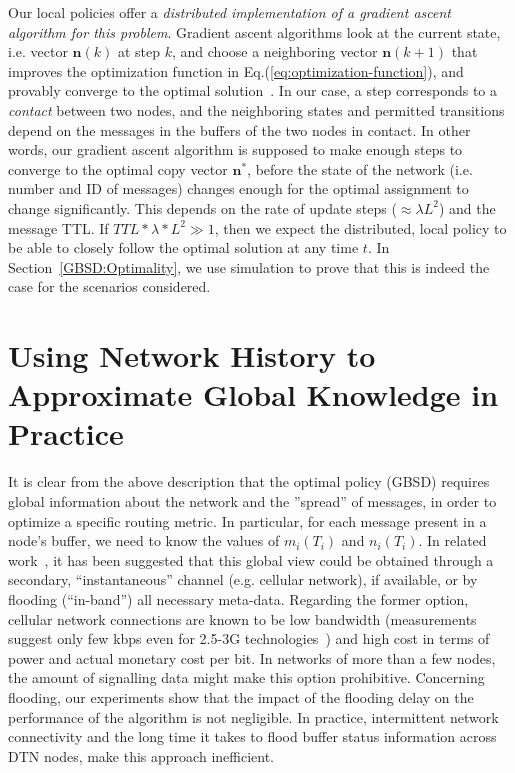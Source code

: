 Our local policies offer a \emph{distributed implementation of a gradient ascent algorithm for this problem}. Gradient ascent algorithms look at the current state, i.e. vector $\mathbf{n}(k)$ at step $k$, and choose a neighboring vector $\mathbf{n}(k+1)$ that improves the optimization function in Eq.(\ref{eq:optimization-function}), and provably converge to the optimal solution~\cite{Boyd:convex-optimization-book}. In our case, a step corresponds to a \emph{contact} between two nodes, and the neighboring states and permitted transitions depend on the messages in the buffers of the two nodes in contact. In other words, our gradient ascent algorithm is supposed to make enough steps to converge to the optimal copy vector $\mathbf{n^{*}}$, before the state of the network (i.e. number and ID of messages) changes enough for the optimal assignment to change significantly. This depends on the rate of update steps ($\approx \lambda L^{2}$) and the message TTL. If $TTL * \lambda * L^{2} \gg 1$, then we expect the distributed, local policy to be able to closely follow the optimal solution at any time $t$. In Section~\ref{GBSD:Optimality}, we use simulation to prove that this is indeed the case for the scenarios considered.

\section{Using Network History to Approximate Global Knowledge in Practice}
\label{sec:learning}

It is clear from the above description that the optimal policy (GBSD) requires global information about the network and the ''spread'' of messages, in order to optimize a specific routing metric. In particular, for each message present in a node's buffer, we need to know the values of $m_i(T_i)$ and $n_i(T_i)$. In related work~\cite{Levine:Sigcomm07}, it has been suggested that this global view could be obtained through a secondary, ``instantaneous'' channel (e.g. cellular network), if available, or by flooding (``in-band'') all necessary meta-data. Regarding the former option, cellular network connections are known to be low bandwidth (measurements suggest only few kbps even for 2.5-3G technologies~\cite{Keshav:multi-nic}) and high cost in terms of power and actual monetary cost per bit. In networks of more than a few nodes, the amount of signalling data might make this option prohibitive. Concerning flooding, our experiments show that the impact of the flooding delay on the performance of the algorithm is not negligible. In practice, intermittent network connectivity and the long time it takes to flood buffer status information across DTN nodes, make this approach inefficient.


